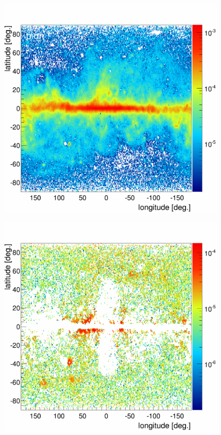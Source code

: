 \begin{figure}[H]
  \centering
  \begin{minipage}[h]{0.45\textwidth}
  	\centering
	\includegraphics[width=1.\linewidth]{pic/results/BKG_PCR_Integral.png}
  	\subcaption{}
  	\label{app:BKGonly_PCR}
  \end{minipage}
  \hfill
  \begin{minipage}[h]{0.45\textwidth}
  	\centering
	\includegraphics[width=1.\linewidth]{pic/results/BKG_BR_Integral.png}

\end{minipage}
\end{figure}
